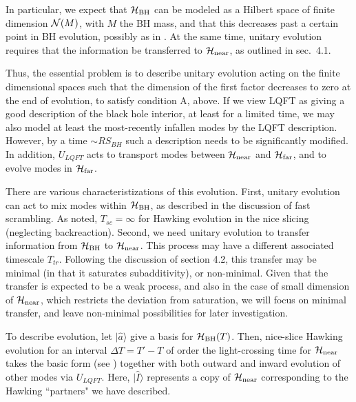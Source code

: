 In particular, we expect that ${{\cal H}_{\rm BH}}$ can be modeled as a Hilbert space of finite dimension ${\cal N}(M)$, with $M$ the BH mass, and that this decreases past a certain point in BH evolution, possibly as in \bhdim.  At the same time, unitary evolution requires that the information be transferred to ${{\cal H}_{\rm near}}$, as outlined in sec.~4.1.  



Thus, the essential problem is to describe unitary evolution acting on the finite dimensional spaces 
%
\eqn{}
%
such that the dimension of the first factor decreases to zero at the end of evolution, to satisfy condition A, above.  If we view LQFT as giving a good description of the black hole interior, at least for a limited time, we may also model at least the most-recently infallen modes by the LQFT description.  However, by a time $\sim RS_{BH}$ such a description needs to be significantly modified.  In addition, $U_{LQFT}$ acts to transport modes between ${{\cal H}_{\rm near}}$ and ${{\cal H}_{\rm far}}$, and to evolve modes in ${{\cal H}_{\rm far}}$.  

There are various characteristizations of this evolution.  First, unitary evolution can act to mix modes within ${{\cal H}_{\rm BH}}$, as described in the discussion of fast scrambling.  As noted, $T_{sc}=\infty$ for Hawking evolution in the nice slicing (neglecting backreaction).  Second, we need unitary evolution to transfer information from ${{\cal H}_{\rm BH}}$ to ${{\cal H}_{\rm near}}$.  This process may have a different associated  timescale $T_{tr}$.  Following the discussion of section 4.2, this transfer may be minimal (in that it saturates subadditivity), or non-minimal.  Given that the transfer is expected to be a weak process, and also in the case of  small dimension of ${{\cal H}_{\rm near}}$, which restricts the deviation from saturation\GiSh, we will focus on minimal transfer, and leave non-minimal possibilities for later investigation.

To describe evolution, let $|\hat a\rangle$ give a basis for ${{\cal H}_{\rm BH}}(T)$.  Then, nice-slice Hawking evolution for an interval $\Delta T=T'-T$ of order the light-crossing time for ${{\cal H}_{\rm near}}$ takes the basic form (see \statepack)
%
\eqn{}
%
together with both outward and inward evolution of other modes via $U_{LQFT}$.  Here, $|{\hat I}\rangle$ represents a copy of ${{\cal H}_{\rm near}}$ corresponding to the Hawking ``partners" we have described.

